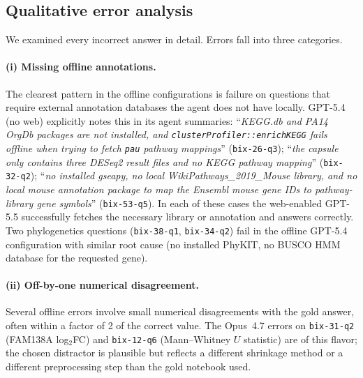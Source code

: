 \documentclass[11pt]{article}
\begin{document}
\subsection{Qualitative error analysis}

We examined every incorrect answer in detail. Errors fall into three
categories.

\paragraph{(i) Missing offline annotations.} The clearest pattern in the
offline configurations is failure on questions that require external
annotation databases the agent does not have locally. GPT-5.4 (no web)
explicitly notes this in its agent summaries:
``\emph{KEGG.db and PA14 OrgDb packages are not installed, and
\texttt{clusterProfiler::enrichKEGG} fails offline when trying to fetch
\texttt{pau} pathway mappings}'' (\texttt{bix-26-q3});
``\emph{the capsule only contains three DESeq2 result files and no KEGG
pathway mapping}'' (\texttt{bix-32-q2});
``\emph{no installed gseapy, no local WikiPathways\_2019\_Mouse library,
and no local mouse annotation package to map the Ensembl mouse gene IDs
to pathway-library gene symbols}'' (\texttt{bix-53-q5}). In each of these
cases the web-enabled GPT-5.5 successfully fetches the necessary library
or annotation and answers correctly. Two phylogenetics questions
(\texttt{bix-38-q1}, \texttt{bix-34-q2}) fail in the offline GPT-5.4
configuration with similar root cause (no installed PhyKIT, no BUSCO
HMM database for the requested gene).

\paragraph{(ii) Off-by-one numerical disagreement.} Several offline
errors involve small numerical disagreements with the gold answer, often
within a factor of 2 of the correct value. The Opus~4.7 errors on
\texttt{bix-31-q2} (FAM138A log$_2$FC) and \texttt{bix-12-q6}
(Mann--Whitney $U$ statistic) are of this flavor; the chosen distractor
is plausible but reflects a different shrinkage method or a different
preprocessing step than the gold notebook used.
\end{document}
